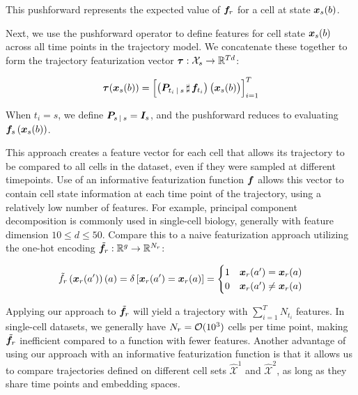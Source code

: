 This pushforward represents the expected value of $\bm{f}_{r}$ for a cell at state $\bm{x}_{s}(b)$.

Next, we use the pushforward operator to define features for cell state $\bm{x}_{s}(b)$ across all time points in the trajectory model. We concatenate these together to form the trajectory featurization vector $\bm{\tau}: \mathcal{X}_{s} \rightarrow \mathbb{R}^{Td}$:

\begin{equation} \label{eq:trajectory_features}
    \bm{\tau}(\bm{x}_{s}(b)) = \Bigl[\left(\bm{P}_{t_i \:\vert\: s} \,\sharp\, \bm{f}_{t_i}\right) \bigl(\bm{x}_{s}(b)\bigr)\Bigr]_{i=1}^{T}
\end{equation}

When $t_i = s$, we define $\bm{P}_{s \:\vert\: s} = \bm{I}_{s}$, and the pushforward reduces to evaluating $\bm{f}_{s}\left(\bm{x}_{s}(b)\right)$.

This approach creates a feature vector for each cell that allows its trajectory to be compared to all cells in the dataset, even if they were sampled at different timepoints. Use of an informative featurization function $\bm{f}$ allows this vector to contain cell state information at each time point of the trajectory, using a relatively low number of features. For example, principal component decomposition is commonly used in single-cell biology, generally with feature dimension $10 \leq d \leq 50$. Compare this to a naive featurization approach utilizing the one-hot encoding $\Tilde{\bm{f}}_{r}: \mathbb{R}^{g} \rightarrow \mathbb{R}^{N_{r}}$:

\begin{equation*} \label{eq:naive_feature}
    \Tilde{f}_{r}\left(\bm{x}_{r}(a')\right)(a) = \delta\left[\bm{x}_{r}(a') = \bm{x}_{r}(a)\right] = \begin{cases}
        1 & \bm{x}_{r}(a') = \bm{x}_{r}(a) \\
        0 & \bm{x}_{r}(a') \neq \bm{x}_{r}(a)
    \end{cases}
\end{equation*}

Applying our approach to $\Tilde{\bm{f}}_{r}$ will yield a trajectory with $\sum_{i=1}^T N_{t_i}$ features. In single-cell datasets, we generally have $N_{r} = \mathcal{O}(10^{3})$ cells per time point, making $\Tilde{\bm{f}}_{r}$ inefficient compared to a function with fewer features. Another advantage of using our approach with an informative featurization function is that it allows us to compare trajectories defined on different cell sets $\hat{\mathcal{X}}^1$ and $\hat{\mathcal{X}}^2$, as long as they share time points and embedding spaces.

